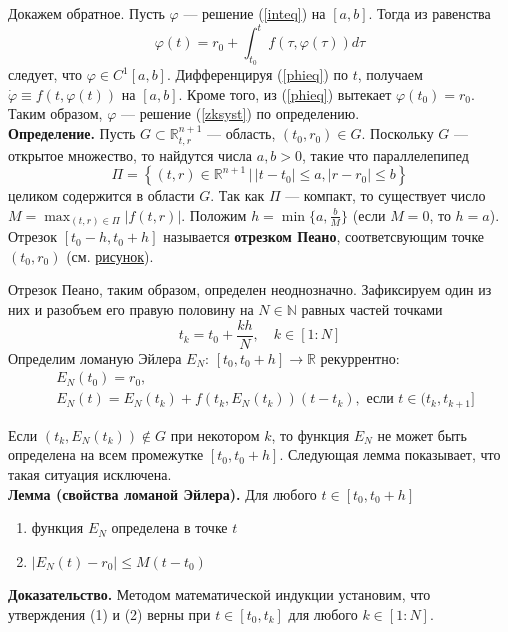 Докажем обратное. Пусть $\varphi$ --- решение (\ref{inteq}) на $[a,b]$. Тогда из равенства
\begin{equation}
    \varphi(t) = r_0 + \int_{t_0}^{t} f(\tau, \varphi(\tau))d\tau \label{phieq}
\end{equation}
следует, что $\varphi \in C^1[a,b]$. Дифференцируя (\ref{phieq}) по $t$, получаем $\dot{\varphi} \equiv f(t, \varphi(t))$ на $[a,b]$. Кроме того, из (\ref{phieq}) вытекает $\varphi(t_0) = r_0$. Таким образом, $\varphi$ --- решение (\ref{zksyst}) по определению.\\

\noindent \textbf{Определение.} Пусть $G \subset \mathbb{R}_{t,r}^{n+1}$ --- область, $(t_0, r_0) \in G$. Поскольку $G$ --- открытое множество, то найдутся числа $a,b > 0$, такие что параллелепипед
\begin{equation*}
    \Pi = \left\{(t,r) \in \mathbb{R}^{n+1}\,|\, |t-t_0| \le a, |r-r_0|\le b \right\}
\end{equation*}
целиком содержится в области $G$. Так как $\Pi$ --- компакт, то существует число $M = \displaystyle\max_{(t,r)\in \Pi} |f(t,r)|$. Положим $h = \min \{a, \frac{b}{M}\}$ (если $M = 0$, то $h = a$). Отрезок $[t_0 - h, t_0 + h]$ называется \textbf{отрезком Пеано}, соответсвующим точке $(t_0, r_0)$ (см. \hyperref[peano]{рисунок}).

Отрезок Пеано, таким образом, определен неоднозначно. Зафиксируем один из них и разобъем его правую половину на $N \in \mathbb{N}$ равных частей точками
\begin{equation*}
    t_k = t_0 + \frac{kh}{N}, \quad k \in [1 : N]
\end{equation*}
Определим ломаную Эйлера $E_N$: $[t_0, t_0 + h] \to \mathbb{R}$ рекуррентно:
\begin{equation}
    \begin{aligned}
        &E_N(t_0) = r_0,\\
        &E_N(t) = E_N(t_k) + f(t_k, E_N(t_k))(t - t_k), \text{ если } t \in (t_k, t_{k+1}]
        \label{eulerlom}
    \end{aligned}
\end{equation}

Если $(t_k, E_N(t_k)) \notin G$ при некотором $k$, то функция $E_N$ не может быть определена на всем промежутке $[t_0, t_0 + h]$. Следующая лемма показывает, что такая ситуация исключена.\\

\noindent \textbf{Лемма (свойства ломаной Эйлера).} Для любого $t \in [t_0, t_0 + h]$
\begin{enumerate}
    \item функция $E_N$ определена в точке $t$
    \item $|E_N(t) - r_0| \le M(t - t_0)$
\end{enumerate}
\textbf{Доказательство.} Методом математической индукции установим, что утверждения (1) и (2) верны при $t \in [t_0, t_k]$ для любого $k \in [1 : N]$.

